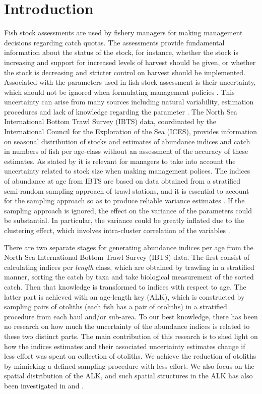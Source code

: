 \documentclass[a4paper 12pt]{article}
\numberwithin{equation}{section}
\begin{document}
\section{Introduction}
Fish stock assessments are used by fishery managers for making management decisions regarding catch quotas. The assessments provide fundamental information about the status of the stock, for instance, whether the stock is increasing and support for increased levels of harvest should be given, or whether the stock is decreasing and stricter control on harvest should be implemented. Associated with the parameters used in fish stock assessment is their uncertainty, which should not be ignored when formulating management policies \citep{walters1981effects, ludwig1981measurement, berg2014evaluation}. This uncertainty can arise from many sources including natural variability, estimation procedures and lack of knowledge regarding the parameter \citep{ehrhardt1997role}. The North Sea International Bottom Trawl Survey (IBTS) data, coordinated by the International Council for the Exploration of the Sea (ICES), provides information on seasonal distribution of stocks and estimates of abundance indices and catch in numbers of fish per age-class without an assessment of the accuracy of these estimates. As stated by \citet{ludwig1981measurement} it is relevant for managers to take into account the uncertainty related to stock size when making management polices. The indices of abundance at age from IBTS  are based on data obtained from a stratified semi-random sampling approach of trawl stations,  and  it is essential to account for the sampling approach so as to produce reliable variance estimates \citep{lehtonen2004practical}. If the sampling approach is ignored, the effect on the variance  of the parameters could be substantial.  In particular, the variance could be greatly inflated  due to the clustering effect, which involves intra-cluster correlation of the variables \citep{aanes2015efficient, lehtonen2004practical}. 

There are two separate stages for generating abundance indices per age from the North Sea International Bottom Trawl Survey (IBTS) data.  The first consist of calculating indices per \textit{length} class, which are obtained by trawling in a stratified manner, sorting the catch by taxa and take biological measurement of the sorted catch. Then that knowledge is transformed to indices with respect to age. The latter part is achieved with an age-length key (ALK), which is constructed by sampling pairs of otoliths (each fish has a pair of otoliths)  in a stratified procedure from each haul and/or sub-area. To our best knowledge, there has been no research on how much the uncertainty of the abundance indices is related to these two distinct parts. The main contribution of this research is to shed light on how the indices estimates and their associated uncertainty estimates change if less effort was spent on collection of otoliths. We achieve the reduction of otoliths by mimicking a defined sampling procedure with less effort. We also focus on the spatial distribution of the ALK, and such spatial structures in the ALK has also been investigated in \citet{berg2012spatial} and  \citet{hirst2012bayesian}.
\end{document}
